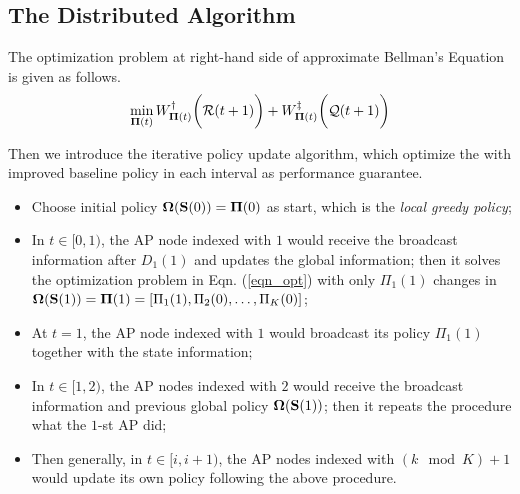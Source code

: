 \subsection{The Distributed Algorithm}

The optimization problem at right-hand side of approximate Bellman's Equation is given as follows.
\begin{align}
    \min_{\boldsymbol{\Pi}(t)} W^{\dagger}_{\boldsymbol{\Pi}(t)}\bigg(\mathcal{R}(t+1)\bigg) + W^{\ddagger}_{\boldsymbol{\Pi}(t)}\bigg(\mathcal{Q}(t+1)\bigg)
    \label{eqn_opt}
\end{align}

Then we introduce the iterative policy update algorithm, which optimize the 
with improved baseline policy in each interval as performance guarantee.
\begin{itemize}
    \item Choose initial policy $\boldsymbol{\Omega}(\mathbf{S}(0)) = \boldsymbol{\Pi}(0)$ as start, which is the \emph{local greedy policy};
    \item In $t\in[0, 1)$, the AP node indexed with $1$ would receive the broadcast information after $D_1(1)$ and updates the global information; then it solves the optimization problem in Eqn. (\ref{eqn_opt}) with only $\Pi_{1}(1)$ changes in $\boldsymbol{\Omega}(\mathbf{S}(1)) = \boldsymbol{\Pi}(1) = [\Pi_{1}(1), \Pi_{2}(0), \dots, \Pi_{K}(0)]$;
    \item At $t=1$, the AP node indexed with $1$ would broadcast its policy $\Pi_{1}(1)$ together with the state information;
    \item In $t\in[1, 2)$, the AP nodes indexed with $2$ would receive the broadcast information and previous global policy $\boldsymbol{\Omega}(\mathbf{S}(1))$; then it repeats the procedure what the $1$-st AP did;
    \item Then generally, in $t\in[{i}, {i+1})$, the AP nodes indexed with $(k \mod K)+1$ would update its own policy following the above procedure.
\end{itemize}

